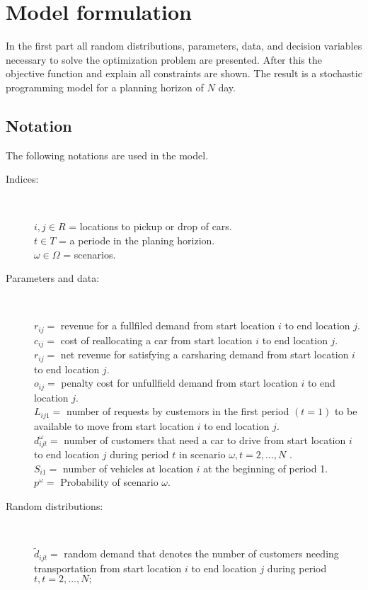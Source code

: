 \section{Model formulation}
In the first part all random distributions, parameters, data, and decision variables necessary to solve the optimization problem are presented. After this the objective function and explain all constraints are shown. The result is a stochastic programming model for a planning horizon of $N$ day.
\subsection{Notation}
The following notations are used in the model.
\begin{description}
\item[Indices:] ~\par

\textbf{$i , j \in R$} = locations to pickup or drop of cars.\\
$t \in T$ = a periode in the planing horizion.\\
$\omega \in \Omega $ = scenarios.
\end{description}
\begin{description}
\item[Parameters and data:] ~\par
$r_{i j}=$ revenue for a fullfiled demand from start location $i$ to end location $j$.\\
$c_{i j}=$ cost of reallocating a car from start location $i$ to end location $j$.\\
$r_{i j}=$ net revenue for satisfying a carsharing demand from start location $i$ to end location $j$.\\
$o_{i j}=$ penalty cost for unfullfield demand from start location $i$ to end location $j$.\\
$L_{i j 1}=$ number of requests by custemors in the first period $(t=1)$ to be available to move from start location $i$ to end location $j$.\\
$d_{i j t}^{\omega}=$ number of customers that need a car to drive from start location $i$ to end location $j$ during period $t$ in scenario $\omega, t=2, \ldots, N $ .\\
$S_{i 1}=$ number of vehicles at location $i$ at the beginning of period 1.\\
$p^{\omega} = $ Probability of scenario $\omega$.
\end{description}
\begin{description}
\item[Random distributions:] ~\par
$\tilde{d}_{i j t}=$ random demand that denotes the number of customers needing transportation from start location $i$ to end location $j$ during period $t, t=2, \ldots, N ;$
\end{description}
